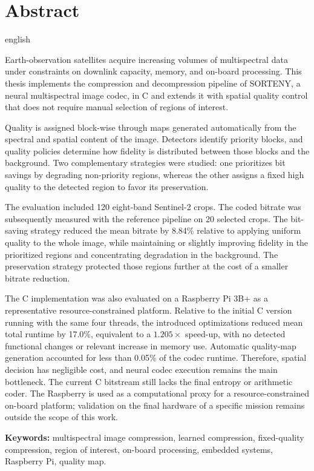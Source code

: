 \chapter*{Abstract\label{Abstract}}

\begin{otherlanguage*}{english}

Earth-observation satellites acquire increasing volumes of multispectral data
under constraints on downlink capacity, memory, and on-board processing. This
thesis implements the compression and decompression pipeline of SORTENY, a
neural multispectral image codec, in C and extends it with spatial quality
control that does not require manual selection of regions of interest.

Quality is assigned block-wise through maps generated automatically from the
spectral and spatial content of the image. Detectors identify priority blocks,
and quality policies determine how fidelity is distributed between those
blocks and the background. Two complementary strategies were studied: one
prioritizes bit savings by degrading non-priority regions, whereas the other
assigns a fixed high quality to the detected region to favor its preservation.

The evaluation included 120 eight-band Sentinel-2 crops. The coded bitrate was
subsequently measured with the reference pipeline on 20 selected crops. The
bit-saving strategy reduced the mean bitrate by 8.84\% relative to applying
uniform quality to the whole image, while maintaining or slightly improving
fidelity in the prioritized regions and concentrating degradation in the
background. The preservation strategy protected those regions further at the
cost of a smaller bitrate reduction.

The C implementation was also evaluated on a Raspberry Pi 3B+ as a
representative resource-constrained platform. Relative to the initial C version
running with the same four threads, the introduced optimizations reduced mean
total runtime by 17.0\%, equivalent to a $1.205\times$ speed-up, with no
detected functional changes or relevant increase in memory use. Automatic
quality-map generation accounted for less than 0.05\% of the codec runtime.
Therefore, spatial decision has negligible cost, and neural codec execution
remains the main bottleneck. The current C bitstream still lacks the final
entropy or arithmetic coder. The Raspberry is used as a computational proxy
for a resource-constrained on-board platform; validation on the final hardware
of a specific mission remains outside the scope of this work.

\textbf{Keywords:} multispectral image compression, learned compression,
fixed-quality compression, region of interest, on-board processing, embedded
systems, Raspberry Pi, quality map.

\end{otherlanguage*}
